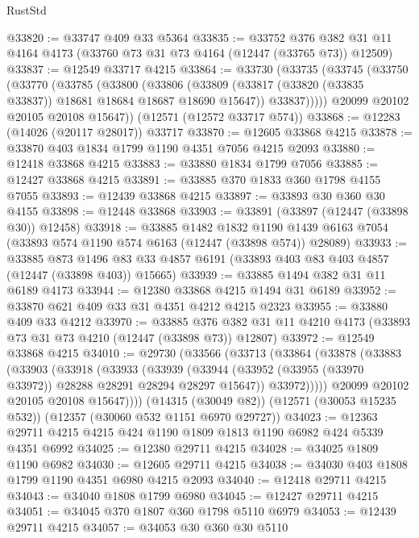 \begin{lexlean}{RustStd}
\begin{coremodule}
@33820 := @33747 @409 @33 @5364
@33835 := @33752
    @376
    @382
    @31
    @11
    @4164
    @4173
    (@33760 @73 @31 @73 @4164 (@12447 (@33765 @73)) @12509)
@33837 := @12549 @33717 @4215
@33864 := @33730
    (@33735
      (@33745
        (@33750
          (@33770
            (@33785
              (@33800
                (@33806
                  (@33809 (@33817 (@33820 (@33835 @33837)) @18681 @18684 @18687 @18690 @15647))
                  @33837)))))
        @20099
        @20102
        @20105
        @20108
        @15647))
    (@12571 (@12572 @33717 @574))
@33868 := @12283 (@14026 (@20117 @28017)) @33717
@33870 := @12605 @33868 @4215
@33878 := @33870 @403 @1834 @1799 @1190 @4351 @7056 @4215 @2093
@33880 := @12418 @33868 @4215
@33883 := @33880 @1834 @1799 @7056
@33885 := @12427 @33868 @4215
@33891 := @33885 @370 @1833 @360 @1798 @4155 @7055
@33893 := @12439 @33868 @4215
@33897 := @33893 @30 @360 @30 @4155
@33898 := @12448 @33868
@33903 := @33891 (@33897 (@12447 (@33898 @30)) @12458)
@33918 := @33885
    @1482
    @1832
    @1190
    @1439
    @6163
    @7054
    (@33893 @574 @1190 @574 @6163 (@12447 (@33898 @574)) @28089)
@33933 := @33885
    @873
    @1496
    @83
    @33
    @4857
    @6191
    (@33893 @403 @83 @403 @4857 (@12447 (@33898 @403)) @15665)
@33939 := @33885 @1494 @382 @31 @11 @6189 @4173
@33944 := @12380 @33868 @4215 @1494 @31 @6189
@33952 := @33870 @621 @409 @33 @31 @4351 @4212 @4215 @2323
@33955 := @33880 @409 @33 @4212
@33970 := @33885
    @376
    @382
    @31
    @11
    @4210
    @4173
    (@33893 @73 @31 @73 @4210 (@12447 (@33898 @73)) @12807)
@33972 := @12549 @33868 @4215
@34010 := @29730
    (@33566
      (@33713
        (@33864
          (@33878
            (@33883
              (@33903
                (@33918
                  (@33933
                    (@33939
                      (@33944 (@33952 (@33955 (@33970 @33972)) @28288 @28291 @28294 @28297 @15647))
                      @33972)))))
            @20099
            @20102
            @20105
            @20108
            @15647))))
    (@14315 (@30049 @82))
    (@12571 (@30053 @15235 @532))
    (@12357 (@30060 @532 @1151 @6970 @29727))
@34023 := @12363 @29711 @4215 @4215 @424 @1190 @1809 @1813 @1190 @6982 @424 @5339 @4351 @6992
@34025 := @12380 @29711 @4215
@34028 := @34025 @1809 @1190 @6982
@34030 := @12605 @29711 @4215
@34038 := @34030 @403 @1808 @1799 @1190 @4351 @6980 @4215 @2093
@34040 := @12418 @29711 @4215
@34043 := @34040 @1808 @1799 @6980
@34045 := @12427 @29711 @4215
@34051 := @34045 @370 @1807 @360 @1798 @5110 @6979
@34053 := @12439 @29711 @4215
@34057 := @34053 @30 @360 @30 @5110

\end{coremodule}
\end{lexlean}
